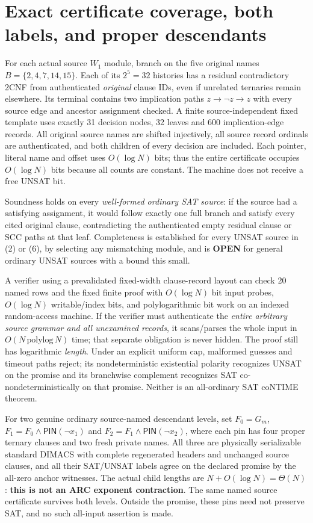 \documentclass[11pt]{article}
\begin{document}
\section{Exact certificate coverage, both labels, and proper descendants}
For each actual source $W_1$ module, branch on the five original names
$B=\{2,4,7,14,15\}$. Each of its $2^5=32$ histories has a residual contradictory 2CNF from authenticated \emph{original} clause IDs, even if unrelated ternaries remain elsewhere. Its terminal contains two implication paths $z\to\neg z\to z$ with every source edge and ancestor assignment checked. A finite source-independent fixed template uses exactly 31 decision nodes, 32 leaves and 600 implication-edge records. All original source names are shifted injectively, all source record ordinals are authenticated, and both children of every decision are included. Each pointer, literal name and offset uses $O(\log N)$ bits; thus the entire certificate occupies $O(\log N)$ bits because all counts are constant. The machine does not receive a free UNSAT bit.

Soundness holds on every \emph{well-formed ordinary SAT source}: if the source had a satisfying assignment, it would follow exactly one full branch and satisfy every cited original clause, contradicting the authenticated empty residual clause or SCC paths at that leaf. Completeness is established for every UNSAT source in (2) or (6), by selecting any mismatching module, and is \textbf{OPEN} for general ordinary UNSAT sources with a bound this small.

A verifier using a prevalidated fixed-width clause-record layout can check 20 named rows and the fixed finite proof with $O(\log N)$ bit input probes, $O(\log N)$ writable/index bits, and polylogarithmic bit work on an indexed random-access machine. If the verifier must authenticate the \emph{entire arbitrary source grammar and all unexamined records}, it scans/parses the whole input in $O(N\,\mathrm{polylog}\,N)$ time; that separate obligation is never hidden. The proof still has logarithmic \emph{length}. Under an explicit uniform cap, malformed guesses and timeout paths reject; its nondeterministic existential polarity recognizes UNSAT on the promise and its branchwise complement recognizes SAT co-nondeterministically on that promise. Neither is an all-ordinary SAT coNTIME theorem.

For two genuine ordinary source-named descendant levels, set $F_0=G_m$, $F_1=F_0\land\mathsf{PIN}(\neg x_1)$ and $F_2=F_1\land\mathsf{PIN}(\neg x_2)$, where each pin has four proper ternary clauses and two fresh private names. All three are physically serializable standard DIMACS with complete regenerated headers and unchanged source clauses, and all their SAT/UNSAT labels agree on the declared promise by the all-zero anchor witnesses. The actual child lengths are $N+O(\log N)=\Theta(N)$: \textbf{this is not an ARC exponent contraction}. The same named source certificate survives both levels. Outside the promise, these pins need not preserve SAT, and no such all-input assertion is made.
\end{document}
